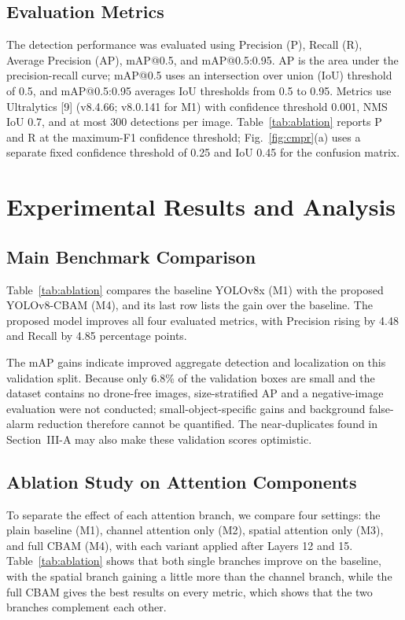 \documentclass[conference]{IEEEtran}
\begin{document}
\subsection{Evaluation Metrics}

The detection performance was evaluated using Precision (P), Recall (R), Average Precision (AP), mAP@0.5, and mAP@0.5:0.95. AP is the area under the precision-recall curve; mAP@0.5 uses an intersection over union (IoU) threshold of 0.5, and mAP@0.5:0.95 averages IoU thresholds from 0.5 to 0.95. Metrics use Ultralytics [9] (v8.4.66; v8.0.141 for M1) with confidence threshold 0.001, NMS IoU 0.7, and at most 300 detections per image. Table~\ref{tab:ablation} reports P and R at the maximum-F1 confidence threshold; Fig.~\ref{fig:cmpr}(a) uses a separate fixed confidence threshold of 0.25 and IoU 0.45 for the confusion matrix.

\section{Experimental Results and Analysis}

\subsection{Main Benchmark Comparison}

Table~\ref{tab:ablation} compares the baseline YOLOv8x (M1) with the proposed YOLOv8-CBAM (M4), and its last row lists the gain over the baseline. The proposed model improves all four evaluated metrics, with Precision rising by 4.48 and Recall by 4.85 percentage points.

The mAP gains indicate improved aggregate detection and localization on this validation split. Because only 6.8\% of the validation boxes are small and the dataset contains no drone-free images, size-stratified AP and a negative-image evaluation were not conducted; small-object-specific gains and background false-alarm reduction therefore cannot be quantified. The near-duplicates found in Section~III-A may also make these validation scores optimistic.


\subsection{Ablation Study on Attention Components}

To separate the effect of each attention branch, we compare four settings: the plain baseline (M1), channel attention only (M2), spatial attention only (M3), and full CBAM (M4), with each variant applied after Layers 12 and 15. Table~\ref{tab:ablation} shows that both single branches improve on the baseline, with the spatial branch gaining a little more than the channel branch, while the full CBAM gives the best results on every metric, which shows that the two branches complement each other.
\end{document}
